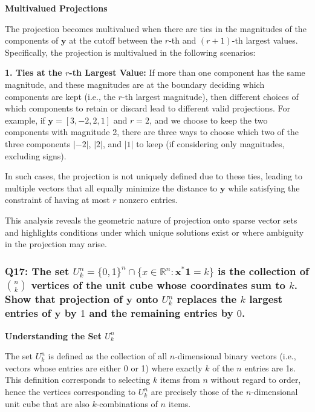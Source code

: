 \documentclass[8pt]{article}
\begin{document}
\textbf{Multivalued Projections}

The projection becomes multivalued when there are ties in the magnitudes of the components of \(\mathbf{y}\) at the cutoff between the \(r\)-th and \((r+1)\)-th largest values. Specifically, the projection is multivalued in the following scenarios:

\textbf{1. Ties at the \(r\)-th Largest Value:}
   If more than one component has the same magnitude, and these magnitudes are at the boundary deciding which components are kept (i.e., the \(r\)-th largest magnitude), then different choices of which components to retain or discard lead to different valid projections. For example, if \(\mathbf{y} = [3, -2, 2, 1]\) and \(r = 2\), and we choose to keep the two components with magnitude 2, there are three ways to choose which two of the three components \(|-2|\), \(|2|\), and \(|1|\) to keep (if considering only magnitudes, excluding signs).

In such cases, the projection is not uniquely defined due to these ties, leading to multiple vectors that all equally minimize the distance to \(\mathbf{y}\) while satisfying the constraint of having at most \(r\) nonzero entries.

This analysis reveals the geometric nature of projection onto sparse vector sets and highlights conditions under which unique solutions exist or where ambiguity in the projection may arise.

\subsubsection*{Q17: The set \(U_k^n = \{0,1\}^n \cap \{x \in \mathbb{R}^n : \mathbf{x}^* \mathbf{1} = k\}\) is the collection of \(\binom{n}{k}\) vertices of the unit cube whose coordinates sum to \(k\). Show that projection of \(\mathbf{y}\) onto \(U_k^n\) replaces the \(k\) largest entries of \(\mathbf{y}\) by \(1\) and the remaining entries by \(0\).}

\textbf{Understanding the Set \( U_k^n \)}

The set \( U_k^n \) is defined as the collection of all \(n\)-dimensional binary vectors (i.e., vectors whose entries are either 0 or 1) where exactly \(k\) of the \(n\) entries are 1s. This definition corresponds to selecting \(k\) items from \(n\) without regard to order, hence the vertices corresponding to \( U_k^n \) are precisely those of the \(n\)-dimensional unit cube that are also \(k\)-combinations of \(n\) items.
\end{document}
